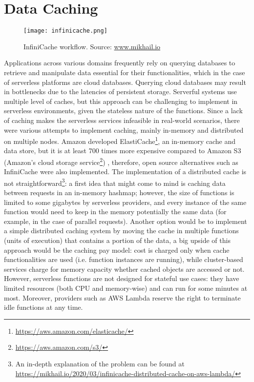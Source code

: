 \documentclass[
	a4paper, %
	12pt,
	twoside, %
]{LTJournalArticle}
\begin{document}
\section{Data Caching}
\label{sec:caching}
\begin{figure*}[!hbt]
	\texttt{[image: infinicache.png]}
	\caption{InfiniCache workflow. Source: \href{https://mikhail.io/2020/03/infinicache-distributed-cache-on-aws-lambda/}{www.mikhail.io}}
	\label{fig:infinicache}
\end{figure*}
Applications across various domains frequently rely on querying databases to retrieve and manipulate data essential for their functionalities, which in the case of serverless platforms are cloud databases. Querying cloud databases may result in bottlenecks due to the latencies of persistent storage. Serverful systems use multiple level of caches, but this approach can be challenging to implement in serverless environments, given the stateless nature of the functions.
Since a lack of caching makes the serverless services infeasible in real-world scenarios, there were various attempts to implement caching, mainly in-memory and distributed on multiple nodes. Amazon developed ElastiCache\footnote{\url{https://aws.amazon.com/elasticache/}}, an in-memory cache and data store, but it is at least 700 times more expensive compared to Amazon S3 (Amazon's cloud storage service\footnote{\url{https://aws.amazon.com/s3/}}) \cite{shafiei_serverless_2022}, therefore, open source alternatives such as InfiniCache \cite{wang_infinicache_nodate} were also implemented. 
The implementation of a distributed cache is not straightforward\footnote{An in-depth explanation of the problem can be found at \url{https://mikhail.io/2020/03/infinicache-distributed-cache-on-aws-lambda/}}: a first idea that might come to mind is caching data between requests in an in-memory hashmap; however, the size of functions is limited to some gigabytes by serverless providers, and every instance of the same function would need to keep in the memory potentially the same data (for example, in the case of parallel requests).
Another option would be to implement a simple distributed caching system by moving the cache in multiple functions (units of execution) that contains a portion of the data, a big upside of this approach would be the caching pay model: cost is charged only when cache functionalities are used (i.e. function instances are running), while cluster-based services charge for memory capacity whether cached objects are accessed or not.
However, serverless functions are not designed for stateful use cases: they have limited resources (both CPU and memory-wise) and can run for some minutes at most. Moreover, providers such as AWS Lambda reserve the right to terminate idle functions at any time.
\end{document}
